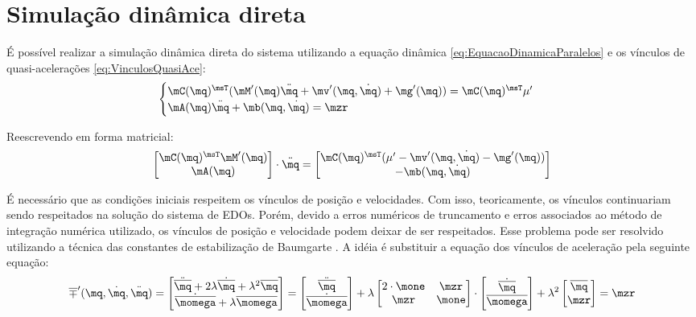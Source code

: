 \documentclass[]{politex}
\begin{document}
\section{Simulação dinâmica direta} 

É possível realizar a simulação dinâmica direta do sistema utilizando a equação dinâmica \eqref{eq:EquacaoDinamicaParalelos} e os vínculos de quasi-acelerações \eqref{eq:VinculosQuasiAce}:
\begin{equation}
\begin{cases}
\mC(\mq)^\msT (   \mM'(\mq)\ddot{\mq} + \mv'(\mq,\dot{\mq}) + \mg'(\mq) ) = \mC(\mq)^\msT \mu' \\
\mA(\mq)\ddot{\mq} + \mb(\mq,\dot{\mq}) = \mzr
\end{cases}
\end{equation}

Reescrevendo em forma matricial:
\begin{equation}
\begin{bmatrix}
\mC(\mq)^\msT \mM'(\mq) \\
\mA(\mq)
\end{bmatrix}
\cdot
\ddot{\mq}
=
\begin{bmatrix}
\mC(\mq)^\msT (\mu' - \mv'(\mq,\dot{\mq}) - \mg'(\mq) ) \\
-\mb(\mq,\dot{\mq})
\end{bmatrix}
\end{equation}

É necessário que as condições iniciais respeitem os vínculos de posição e velocidades. Com isso, teoricamente, os vínculos continuariam sendo respeitados na solução do sistema de EDOs. Porém, devido a erros numéricos de truncamento e erros associados ao método de integração numérica utilizado, os vínculos de posição e velocidade podem deixar de ser respeitados. Esse problema pode ser resolvido utilizando a técnica das constantes de estabilização de Baumgarte \cite{Baumgarte}. A idéia é substituir a equação dos vínculos de aceleração pela seguinte equação:
\begin{equation} \label{eq:VinculosQuasiAce2}
\overline{\mp}'(\mq, \dot{\mq}, \ddot{\mq}) =
\begin{bmatrix}
\ddot{\overline{\mq}} + 2\lambda \dot{\overline{\mq}} + \lambda^2 \overline{\mq} \\
\dot{\overline{\momega}} + \lambda \overline{\momega}
\end{bmatrix}
=
\begin{bmatrix}
\ddot{\overline{\mq}} \\
\dot{\overline{\momega}}
\end{bmatrix}
+
\lambda
\begin{bmatrix}
2 \cdot \mone & \mzr \\
\mzr & \mone
\end{bmatrix}
\cdot
\begin{bmatrix}
\dot{\overline{\mq}} \\
\overline{\momega}
\end{bmatrix}
+
\lambda^2
\begin{bmatrix}
\overline{\mq} \\
\mzr
\end{bmatrix}
= \mzr
\end{equation}
\end{document}
